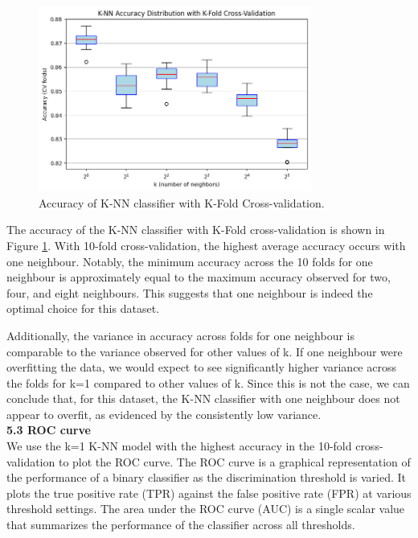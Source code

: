 \documentclass[12pt]{article}
\begin{document}
\begin{figure}[h!]
\centering
\includegraphics[width=0.8\textwidth]{figures/knn_accuracy_kfold.png}
\caption{Accuracy of K-NN classifier with K-Fold Cross-validation.}
\label{fig:knn_accuracy_kfold}
\end{figure}

The accuracy of the K-NN classifier with K-Fold cross-validation is shown in Figure \ref{fig:knn_accuracy_kfold}. With 10-fold cross-validation, the highest average accuracy occurs with one neighbour. Notably, the minimum accuracy across the 10 folds for one neighbour is approximately equal to the maximum accuracy observed for two, four, and eight neighbours. This suggests that one neighbour is indeed the optimal choice for this dataset.

Additionally, the variance in accuracy across folds for one neighbour is comparable to the variance observed for other values of k. If one neighbour were overfitting the data, we would expect to see significantly higher variance across the folds for k=1 compared to other values of k. Since this is not the case, we can conclude that, for this dataset, the K-NN classifier with one neighbour does not appear to overfit, as evidenced by the consistently low variance.
\\

\textbf{5.3 ROC curve}
\\
We use the k=1 K-NN model with the highest accuracy in the 10-fold cross-validation to plot the ROC curve. The ROC curve is a graphical representation of the performance of a binary classifier as the discrimination threshold is varied. It plots the true positive rate (TPR) against the false positive rate (FPR) at various threshold settings. The area under the ROC curve (AUC) is a single scalar value that summarizes the performance of the classifier across all thresholds.
\end{document}
